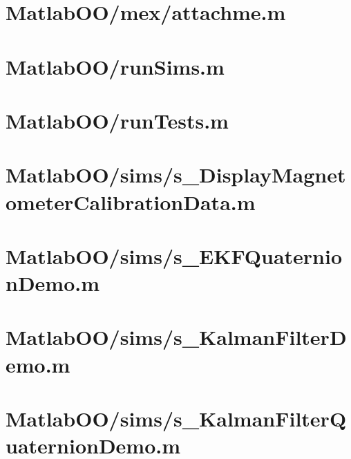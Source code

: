 \pagebreak
\section{MatlabOO/mex/attachme.m}\label{code:MatlabOO/mex/attachme.m}


\pagebreak
\section{MatlabOO/runSims.m}\label{code:MatlabOO/runSims.m}


\pagebreak
\section{MatlabOO/runTests.m}\label{code:MatlabOO/runTests.m}


\pagebreak
\section{MatlabOO/sims/s\_DisplayMagnetometerCalibrationData.m}\label{code:MatlabOO/sims/s_DisplayMagnetometerCalibrationData.m}


\pagebreak
\section{MatlabOO/sims/s\_EKFQuaternionDemo.m}\label{code:MatlabOO/sims/s_EKFQuaternionDemo.m}


\pagebreak
\section{MatlabOO/sims/s\_KalmanFilterDemo.m}\label{code:MatlabOO/sims/s_KalmanFilterDemo.m}


\pagebreak
\section{MatlabOO/sims/s\_KalmanFilterQuaternionDemo.m}\label{code:MatlabOO/sims/s_KalmanFilterQuaternionDemo.m}


